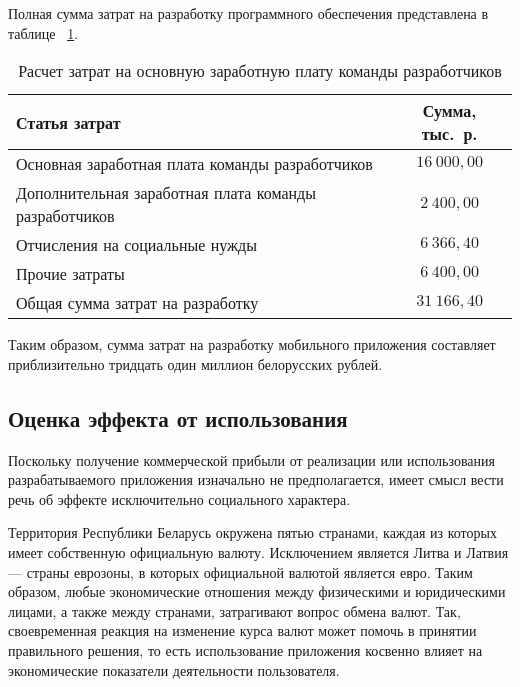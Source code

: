 Полная сумма затрат на разработку программного обеспечения представлена в таблице
~\ref{tbl:teo_sum_cost}.

\begin{table} [h!]
  \caption{
    Расчет затрат на основную заработную плату команды разработчиков
  }\label{tbl:teo_sum_cost}
  \begin{tabular}{| m{13.5cm} | c |}
    \hline

    \parbox{13.5cm}{
    \smallskip
    \centering Статья затрат
    \smallskip
    }
    &
      \parbox{2cm}{
      \smallskip
      \centering Сумма, тыс.~р.
    \smallskip
    } \\
    \hline

    Основная заработная плата команды разработчиков
    & \( 16 \: 000{,}00 \)\\
    \hline

    Дополнительная заработная плата команды разработчиков
    & \( 2 \: 400{,}00 \)\\
    \hline

    Отчисления на социальные нужды
    & \( 6 \: 366{,}40 \)\\
    \hline

    Прочие затраты
    & \( 6 \: 400{,}00 \)\\
    \hline

    Общая сумма затрат на разработку
    & \( 31 \: 166{,}40 \) \\
    \hline
  \end{tabular}
\end{table}

Таким образом, сумма затрат на разработку мобильного приложения
составляет приблизительно тридцать один миллион белорусских рублей.

\subsection{Оценка эффекта от использования}

Поскольку получение коммерческой прибыли от реализации или использования
разрабатываемого приложения изначально не предполагается,
имеет смысл вести речь об эффекте исключительно социального характера.

Территория Республики Беларусь окружена пятью странами, каждая из которых
имеет собственную официальную валюту. Исключением является Литва и Латвия ---
страны еврозоны, в которых официальной валютой является евро. Таким
образом, любые экономические отношения между физическими и юридическими лицами,
а также между странами, затрагивают вопрос обмена валют.
Так, своевременная реакция на изменение курса валют может помочь
в принятии правильного решения, то есть использование приложения
косвенно влияет на экономические показатели деятельности пользователя.
